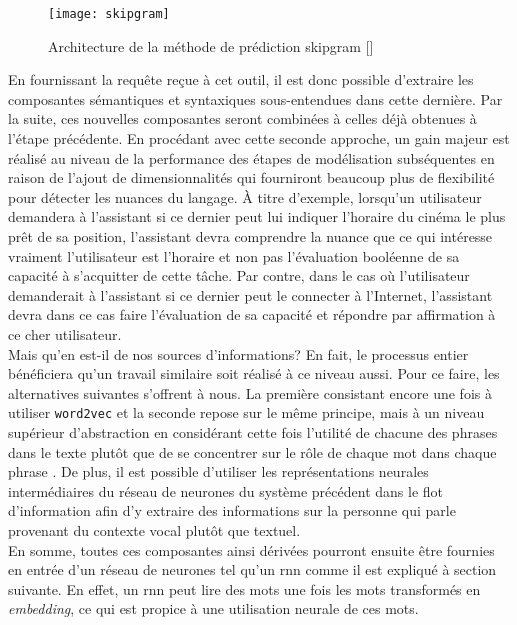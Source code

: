 \begin{figure}[ht]
  \centering
  \texttt{[image: skipgram]}
  \caption{Architecture de la méthode de prédiction \gls{skipgram} []}
  \label{fig:skipgram}
\end{figure}

En fournissant la requête reçue à cet outil, il est donc possible d'extraire les composantes sémantiques et syntaxiques sous-entendues dans cette dernière. Par la suite, ces nouvelles composantes seront combinées à celles déjà obtenues à l'étape précédente. En procédant avec cette seconde approche, un gain majeur est réalisé au niveau de la performance des étapes de modélisation subséquentes en raison de l'ajout de dimensionnalités qui fourniront beaucoup plus de flexibilité pour détecter les nuances du langage. À titre d'exemple, lorsqu'un utilisateur demandera à l'assistant si ce dernier peut lui indiquer l'horaire du cinéma le plus prêt de sa position, l'assistant devra comprendre la nuance que ce qui intéresse vraiment l'utilisateur est l'horaire et non pas l'évaluation booléenne de sa capacité à s'acquitter de cette tâche. Par contre, dans le cas où l'utilisateur demanderait à l'assistant si ce dernier peut le connecter à l'Internet, l'assistant devra dans ce cas faire l'évaluation de sa capacité et répondre par affirmation à ce cher utilisateur. \\

Mais qu'en est-il de nos sources d'informations? En fait, le processus entier bénéficiera qu'un travail similaire soit réalisé à ce niveau aussi. Pour ce faire, les alternatives suivantes s'offrent à nous. La première consistant encore une fois à utiliser \texttt{word2vec} et la seconde repose sur le même principe, mais à un niveau supérieur d'abstraction en considérant cette fois l'utilité de chacune des phrases dans le texte plutôt que de se concentrer sur le rôle de chaque mot dans chaque phrase \cite{inferSent}. De plus, il est possible d'utiliser les représentations neurales intermédiaires du réseau de neurones du système précédent dans le flot d'information afin d'y extraire des informations sur la personne qui parle provenant du contexte vocal plutôt que textuel. \\

En somme, toutes ces composantes ainsi dérivées pourront ensuite être fournies en entrée d'un réseau de neurones tel qu'un \gls{rnn} comme il est expliqué à section suivante. En effet, un \gls{rnn} peut lire des mots une fois les mots transformés en \textit{embedding}, ce qui est propice à une utilisation neurale de ces mots.
